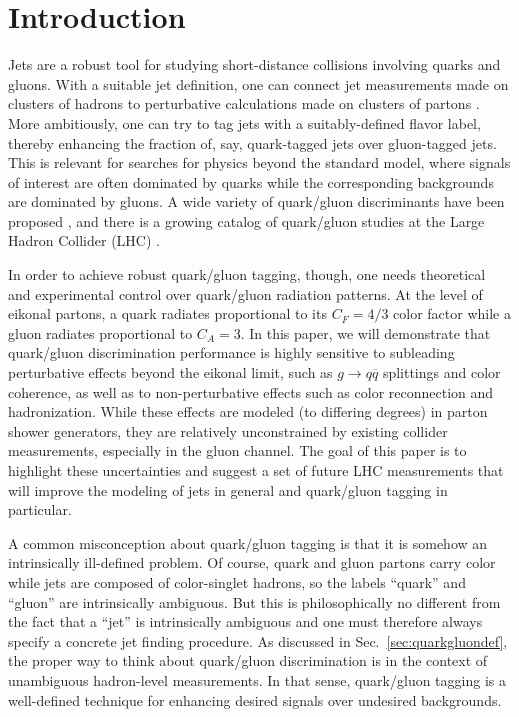 \documentclass[11pt,letterpaper]{article}
\DeclareRobustCommand{\Sec}[1]{Sec.~\ref{#1}}
\begin{document}
\section{Introduction}
\label{introduction}

Jets are a robust tool for studying short-distance collisions involving quarks and gluons.  With a suitable jet definition, one can connect jet measurements made on clusters of hadrons to perturbative calculations made on clusters of partons \cite{}.  More ambitiously, one can try to tag jets with a suitably-defined flavor label, thereby enhancing the fraction of, say, quark-tagged jets over gluon-tagged jets.  This is relevant for searches for physics beyond the standard model, where signals of interest are often dominated by quarks while the corresponding backgrounds are dominated by gluons.  A wide variety of quark/gluon discriminants have been proposed \cite{}, and there is a growing catalog of quark/gluon studies at the Large Hadron Collider (LHC) \cite{}.

In order to achieve robust quark/gluon tagging, though, one needs theoretical and experimental control over quark/gluon radiation patterns.  At the level of eikonal partons, a quark radiates proportional to its $C_F = 4/3$ color factor while a gluon radiates proportional to $C_A = 3$.  In this paper, we will demonstrate that quark/gluon discrimination performance is highly sensitive to subleading perturbative effects beyond the eikonal limit, such as $g \to q \overline{q}$ splittings and color coherence, as well as to non-perturbative effects such as color reconnection and hadronization.   While these effects are modeled (to differing degrees) in parton shower generators, they are relatively unconstrained by existing collider measurements, especially in the gluon channel.  The goal of this paper is to highlight these uncertainties and suggest a set of future LHC measurements that will improve the modeling of jets in general and quark/gluon tagging in particular.

A common misconception about quark/gluon tagging is that it is somehow an intrinsically ill-defined problem.  Of course, quark and gluon partons carry color while jets are composed of color-singlet hadrons, so the labels ``quark'' and ``gluon'' are intrinsically ambiguous.  But this is philosophically no different from the fact that a ``jet'' is intrinsically ambiguous and one must therefore always specify a concrete jet finding procedure.  As discussed in \Sec{sec:quarkgluondef}, the proper way to think about quark/gluon discrimination is in the context of unambiguous hadron-level measurements.  In that sense, quark/gluon tagging is a well-defined technique for enhancing desired signals over undesired backgrounds.
\end{document}
